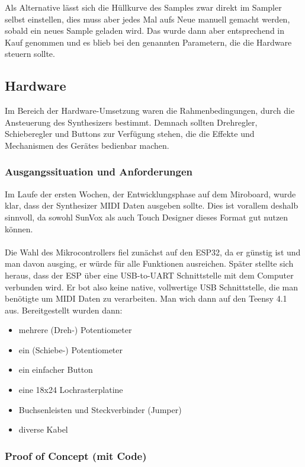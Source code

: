 \documentclass[12pt]{scrartcl}%
\theoremstyle{nonumberplain}
\begin{document}
\noindent Als Alternative lässt sich die Hüllkurve des Samples zwar direkt im Sampler selbst einstellen, dies muss aber jedes Mal aufs Neue manuell gemacht werden, sobald ein neues Sample geladen wird. Das wurde dann aber entsprechend in Kauf genommen und es blieb bei den genannten Parametern, die die Hardware steuern sollte.\\

\subsection{Hardware}

Im Bereich der Hardware-Umsetzung waren die Rahmenbedingungen, durch die Ansteuerung des Synthesizers bestimmt. Demnach sollten Drehregler, Schieberegler und Buttons zur Verfügung stehen, die die Effekte und Mechanismen des Gerätes bedienbar machen.

\subsubsection{Ausgangssituation und Anforderungen}

Im Laufe der ersten Wochen, der Entwicklungsphase auf dem Miroboard, wurde klar, dass der Synthesizer MIDI Daten ausgeben sollte. Dies ist vorallem deshalb sinnvoll, da sowohl SunVox als auch Touch Designer dieses Format gut nutzen können.
\\\\
Die Wahl des Mikrocontrollers fiel zunächst auf den ESP32, da er günstig ist und man davon ausging, er würde für alle Funktionen ausreichen. Später stellte sich heraus, dass der ESP über eine USB-to-UART Schnittstelle mit dem Computer verbunden wird. Er bot also keine native, vollwertige USB Schnittstelle, die man benötigte um MIDI Daten zu verarbeiten. Man wich dann auf den Teensy 4.1 aus.
\newpage
Bereitgestellt wurden dann:
\begin{itemize}
  \item mehrere (Dreh-) Potentiometer
  \item ein (Schiebe-) Potentiometer
  \item ein einfacher Button
  \item eine 18x24 Lochrasterplatine
  \item Buchsenleisten und Steckverbinder (Jumper)
  \item diverse Kabel
\end{itemize}

\subsubsection{Proof of Concept (mit Code)}
\end{document}
